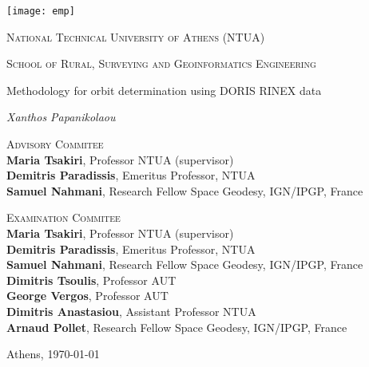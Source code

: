 \begin{center}
  \texttt{[image: emp]}\par\vspace{.8cm}
  {\Large \textsc{National Technical University of Athens (NTUA)} \par}
  {\Large \textsc{School of Rural, Surveying and Geoinformatics Engineering} \par}
  \vspace{.5cm}
  {\huge Methodology for orbit determination using DORIS RINEX data \par}
  \vspace{1cm}
  {\Large\itshape Xanthos Papanikolaou\par}
  \vfill

  \textsc{Advisory Commitee}\\
  \textbf{Maria Tsakiri}, Professor NTUA (supervisor)\\
  \textbf{Demitris Paradissis}, Emeritus Professor, NTUA \\
  \textbf{Samuel Nahmani}, Research Fellow Space Geodesy, IGN/IPGP, France \par

  \textsc{Examination Commitee}\\
  \textbf{Maria Tsakiri}, Professor NTUA (supervisor)\\
  \textbf{Demitris Paradissis}, Emeritus Professor, NTUA \\
  \textbf{Samuel Nahmani}, Research Fellow Space Geodesy, IGN/IPGP, France \\
  \textbf{Dimitris Tsoulis}, Professor AUT \\
  \textbf{George Vergos}, Professor AUT \\
  \textbf{Dimitris Anastasiou}, Assistant Professor NTUA \\
  \textbf{Arnaud Pollet}, Research Fellow Space Geodesy, IGN/IPGP, France \par

  \vfill
  {\large Athens, \monthyeardate\today\par}
\end{center}
\clearpage

